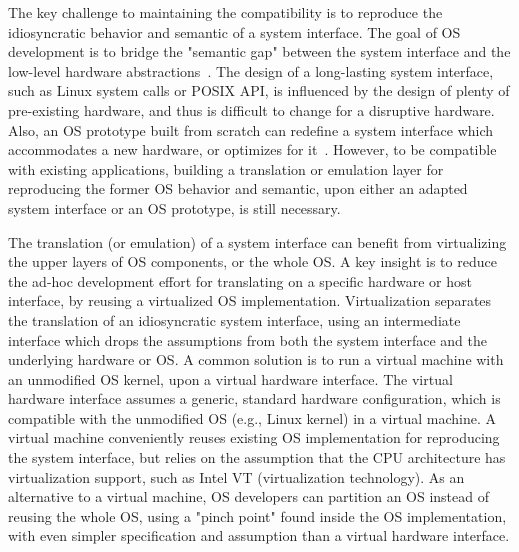 The key challenge to maintaining the compatibility is to reproduce
the idiosyncratic behavior and semantic
of a system interface.
The goal of OS development is to bridge the "semantic gap" between the system interface and the low-level hardware abstractions~\cite{tanenbaum19os-textbook}.
The design of a long-lasting system interface, such as Linux system calls or POSIX API, is influenced by the design of plenty of pre-existing hardware,
and thus is difficult to change for a disruptive hardware.
Also, an OS prototype built from scratch
can redefine a system interface which accommodates a new hardware, or optimizes for it~\cite{baumann09barrelfish,peter14arrakis,belay14ix}.
However, to be compatible with existing applications,
building a translation or emulation layer for reproducing the former OS behavior and semantic, upon either an adapted system interface or an OS prototype, is still necessary.



The translation (or emulation) of a system interface
can benefit from virtualizing the upper layers of OS components,
or the whole OS. 
A key insight is to reduce the ad-hoc development effort for translating on a specific hardware or host interface, by reusing a virtualized OS implementation.
Virtualization separates the translation of an idiosyncratic system interface,
using an intermediate interface which drops the assumptions
from both the system interface and the underlying hardware or OS.
A common solution is to run a virtual machine with an unmodified OS kernel, upon a virtual hardware interface.
The virtual hardware interface 
assumes a generic, standard hardware configuration, %
which is compatible with the unmodified OS (e.g., Linux kernel) in a virtual machine.
A virtual machine conveniently reuses existing OS implementation
for reproducing the system interface,
but relies on the assumption that the CPU architecture has virtualization support,
such as Intel VT (virtualization technology).
As an alternative to a virtual machine, OS developers can partition an OS instead of reusing the whole OS,
using a "pinch point" found inside the OS implementation,
with even simpler specification and assumption than a virtual hardware interface.





